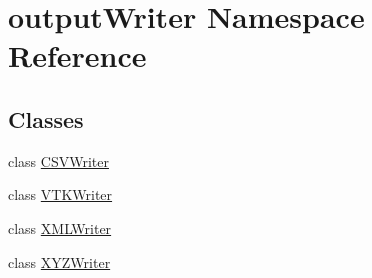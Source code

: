 \hypertarget{namespaceoutputWriter}{}\section{output\+Writer Namespace Reference}
\label{namespaceoutputWriter}
\subsection*{Classes}
\begin{DoxyCompactItemize}
\item 
class \hyperlink{classoutputWriter_1_1CSVWriter}{C\+S\+V\+Writer}
\item 
class \hyperlink{classoutputWriter_1_1VTKWriter}{V\+T\+K\+Writer}
\item 
class \hyperlink{classoutputWriter_1_1XMLWriter}{X\+M\+L\+Writer}
\item 
class \hyperlink{classoutputWriter_1_1XYZWriter}{X\+Y\+Z\+Writer}
\end{DoxyCompactItemize}
